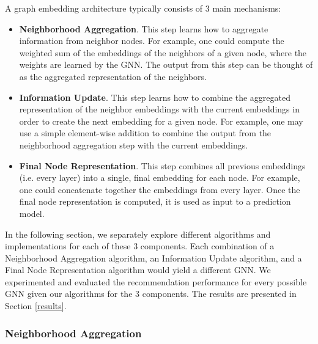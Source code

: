 \documentclass{article}
\begin{document}
A graph embedding architecture typically consists of 3 main mechanisms:

\begin{itemize}
    \item \textbf{Neighborhood Aggregation}. This step learns how to aggregate information from neighbor nodes. For example, one could compute the weighted sum of the embeddings of the neighbors of a given node, where the weights are learned by the GNN. The output from this step can be thought of as the aggregated representation of the neighbors.
    \item \textbf{Information Update}. This step learns how to combine the aggregated representation of the neighbor embeddings with the current embeddings in order to create the next embedding for a given node. For example, one may use a simple element-wise addition to combine the output from the neighborhood aggregation step with the current embeddings.
    \item \textbf{Final Node Representation}. This step combines all previous embeddings (i.e. every layer) into a single, final embedding for each node. For example, one could concatenate together the embeddings from every layer. Once the final node representation is computed, it is used as input to a prediction model.
\end{itemize}

In the following section, we separately explore different algorithms and implementations for each of these 3 components. Each combination of a Neighborhood Aggregation algorithm, an Information Update algorithm, and a Final Node Representation algorithm would yield a different GNN. We experimented and evaluated the recommendation performance for every possible GNN given our algorithms for the 3 components. The results are presented in Section \ref{results}.

\subsubsection{Neighborhood Aggregation}
\end{document}
